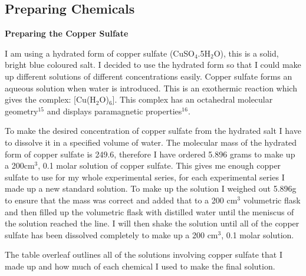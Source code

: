 	\subsection{Preparing Chemicals} \label{Preparing Chemicals}

\textbf{Preparing the Copper Sulfate}

I am using a hydrated form of copper sulfate (CuSO$_4$.5H$_2$O), this is a solid, bright blue coloured salt. I decided to use the hydrated form so that I could make up different solutions of different concentrations easily. Copper sulfate forms an aqueous solution when water is introduced. This is an exothermic reaction which gives the complex: [Cu(H$_2$O)$_6$]. This complex has an octahedral molecular geometry$^{15}$ and displays paramagnetic properties$^{16}$.

To make the desired concentration of copper sulfate from the hydrated salt I have to dissolve it in a specified volume of water. The molecular mass of the hydrated form of copper sulfate is 249.6, therefore I have ordered 5.896 grams to make up a 200cm$^3$, 0.1 molar solution of copper sulfate. This gives me enough copper sulfate to use for my whole experimental series, for each experimental series I made up a new standard solution. To make up the solution I weighed out 5.896g to ensure that the mass was correct and added that to a 200 cm$^3$ volumetric flask and then filled up the volumetric flask with distilled water until the meniscus of the solution reached the line. I will then shake the solution until all of the copper sulfate has been dissolved completely to make up a 200 cm$^3$, 0.1 molar solution.



The table overleaf outlines all of the solutions involving copper sulfate that I made up and how much of each chemical I used to make the final solution.




